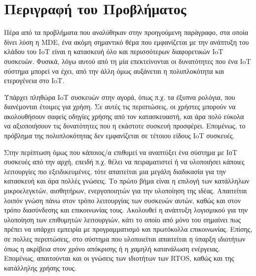 \section{Περιγραφή του Προβλήματος}
\label{section:problem_description}


Πέρα από τα προβλήματα που αναλύθηκαν στην προηγούμενη παράγραφο, στα οποία δίνει λύση η MDE, ένα ακόμη σημαντικό θέμα που εμφανίζεται με την ανάπτυξη του κλάδου του IoT είναι η κατασκευή όλο και περισσότερων διαφορετικών IoT συσκευών. Φυσικά, λόγω αυτού από τη μία επεκτείνονται οι δυνατότητες που ένα IoT σύστημα μπορεί να έχει, από την άλλη όμως αυξάνεται η πολυπλοκότητα και ετερογένεια στο IoT.

Υπάρχει πληθώρα IoT συσκευών στην αγορά, όπως π.χ. τα έξυπνα ρολόγια, που διανέμονται έτοιμες για χρήση. Σε αυτές τις περιπτώσεις, οι χρήστες μπορούν να ακολουθήσουν σαφείς οδηγίες χρήσης από τον κατασκευαστή, και άρα πολύ εύκολα να αξιοποιήσουν τις δυνατότητες που η εκάστοτε συσκευή προσφέρει. Επομένως, το πρόβλημα της πολυπλοκότητας δεν εμφανίζεται σε τέτοιου είδους IoT συσκευές.

Στην περίπτωση όμως που κάποιος/α επιθυμεί να αναπτύξει ένα σύστημα με ΙοΤ συσκευές από την αρχή, επειδή π.χ. θέλει να πειραματιστεί ή να υλοποιήσει κάποιες λειτουργίες πιο εξειδικευμένες, τότε απαιτείται μια μεγάλη διαδικασία για την κατασκευή και άρα πολλές γνώσεις. Το πρώτο βήμα είναι η επιλογή των κατάλληλων μικροελεγκτών, αισθητήρων, ενεργοποιητών για την υλοποίηση της ιδέας. Απαιτείται λοιπόν γνώση πάνω στον τρόπο λειτουργίας των συσκευών αυτών, καθώς και στον τρόπο διασύνδεσης και επικοινωνίας τους. Ακολουθεί η ανάπτυξη λογισμικού για την υλοποίηση των επιθυμητών λειτουργιών, κάτι το οποίο από μόνο του σημαίνει πως πρέπει να υπάρχει εμπειρία με προγραμματισμό και πρωτόκολλα επικοινωνίας. Επίσης, σε πολλες περιπτώσεις, στο σύστημα που υλοποιείται απαιτείται η ύπαρξη ιδιοτήτων όπως η ακρίβεια στον χρόνο απόκρισης ή η χαμηλή κατανάλωση ενέργειας. Επομένως, απαιτούνται και οι γνώσεις των ιδιοτήτων των RTOS, καθώς και της κατάλληλης χρήσης τους.
